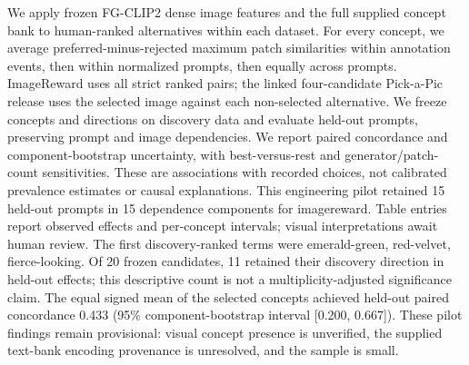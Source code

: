 We apply frozen FG-CLIP2 dense image features and the full supplied concept bank to human-ranked alternatives within each dataset. For every concept, we average preferred-minus-rejected maximum patch similarities within annotation events, then within normalized prompts, then equally across prompts. ImageReward uses all strict ranked pairs; the linked four-candidate Pick-a-Pic release uses the selected image against each non-selected alternative. We freeze concepts and directions on discovery data and evaluate held-out prompts, preserving prompt and image dependencies. We report paired concordance and component-bootstrap uncertainty, with best-versus-rest and generator/patch-count sensitivities. These are associations with recorded choices, not calibrated prevalence estimates or causal explanations. This engineering pilot retained 15 held-out prompts in 15 dependence components for imagereward. Table entries report observed effects and per-concept intervals; visual interpretations await human review.
The first discovery-ranked terms were emerald-green, red-velvet, fierce-looking. Of 20 frozen candidates, 11 retained their discovery direction in held-out effects; this descriptive count is not a multiplicity-adjusted significance claim. The equal signed mean of the selected concepts achieved held-out paired concordance 0.433 (95\% component-bootstrap interval [0.200, 0.667]). These pilot findings remain provisional: visual concept presence is unverified, the supplied text-bank encoding provenance is unresolved, and the sample is small.
